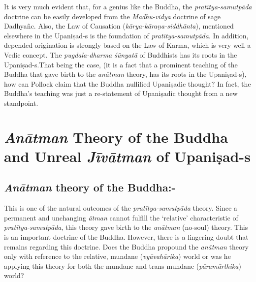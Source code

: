 It is very much evident that, for a genius like the Buddha, the \textit{pratītya-samutpāda} doctrine can be easily developed from the \textit{Madhu-vidyā} doctrine of sage Dadhyañc. Also, the Law of Causation (\textit{kārya-kāraṇa-siddhānta}), mentioned elsewhere in the Upaniṣad-s is the foundation of \textit{pratītya-samutpāda}. In addition, depended origination is strongly based on the Law of Karma, which is very well a Vedic concept. The \textit{pugdala-dharma} \textit{śūnyatā} of Buddhists has its roots in the Upaniṣad-s.\break That being the case, (it is a fact that a prominent teaching of the Buddha that gave birth to the \textit{anātman} theory, has its roots in the Upaniṣad-s), how can Pollock claim that the Buddha nullified Upaniṣadic thought? In fact, the Buddha’s teaching was just a re-statement of Upaniṣadic thought from a new standpoint.

\vspace{-.3cm}

\section*{\textit{Anātman} Theory of the Buddha \hfill\break and Unreal \textit{Jīvātman} of Upaniṣad-s}

\subsection*{\textit{Anātman} theory of the Buddha:-}

\vspace{-.3cm}

This is one of the natural outcomes of the \textit{pratītya-samutpāda} theory. Since a permanent and unchanging \textit{ātman} cannot fulfill the ‘relative’ characteristic of \textit{pratītya-samutpāda}, this theory gave birth to the \textit{anātman} (no-soul) theory. This is an important doctrine of the Buddha. However, there is a lingering doubt that remains regarding this doctrine. Does the Buddha propound the \textit{anātman} theory only with reference to the relative, mundane (\textit{vyāvahārika}) world or was he applying this theory for both the mundane and trans-mundane (\textit{pāramārthika}) world?

